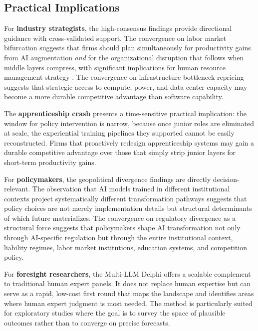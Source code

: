 \documentclass[preprint,review,12pt]{elsarticle}
\begin{document}
\subsection{Practical Implications}
\label{sec:practical_implications}

For \textbf{industry strategists}, the high-consensus findings provide directional guidance with cross-validated support. The convergence on labor market bifurcation suggests that firms should plan simultaneously for productivity gains from AI augmentation \textit{and} for the organizational disruption that follows when middle layers compress, with significant implications for human resource management strategy \citep{budhwar2023hrm}. The convergence on infrastructure bottleneck repricing suggests that strategic access to compute, power, and data center capacity may become a more durable competitive advantage than software capability.

The \textbf{apprenticeship crash} presents a time-sensitive practical implication: the window for policy intervention is narrow, because once junior roles are eliminated at scale, the experiential training pipelines they supported cannot be easily reconstructed. Firms that proactively redesign apprenticeship systems may gain a durable competitive advantage over those that simply strip junior layers for short-term productivity gains.

For \textbf{policymakers}, the geopolitical divergence findings are directly decision-relevant. The observation that AI models trained in different institutional contexts project systematically different transformation pathways suggests that policy choices are not merely implementation details but structural determinants of which future materializes. The convergence on regulatory divergence as a structural force suggests that policymakers shape AI transformation not only through AI-specific regulation but through the entire institutional context, liability regimes, labor market institutions, education systems, and competition policy.

For \textbf{foresight researchers}, the Multi-LLM Delphi offers a scalable complement to traditional human expert panels. It does not replace human expertise but can serve as a rapid, low-cost first round that maps the landscape and identifies areas where human expert judgment is most needed. The method is particularly suited for exploratory studies where the goal is to survey the space of plausible outcomes rather than to converge on precise forecasts.
\end{document}

